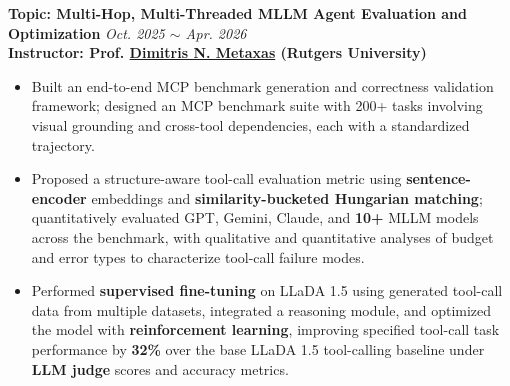 \documentclass{article}
\begin{document}
\vspace{-10pt}
\noindent \textbf{Topic: Multi-Hop, Multi-Threaded MLLM Agent Evaluation and Optimization} \hfill \emph{Oct. 2025 $\sim$ Apr. 2026}\\
\textbf{Instructor: Prof. \href{https://people.cs.rutgers.edu/~dnm/}{\color{blue}Dimitris N. Metaxas} (Rutgers University)}
\begin{itemize}[noitemsep,nolistsep,leftmargin=*]
\item Built an end-to-end MCP benchmark generation and correctness validation framework; designed an MCP benchmark suite with 200+ tasks involving visual grounding and cross-tool dependencies, each with a standardized trajectory.
\item Proposed a structure-aware tool-call evaluation metric using \textbf{sentence-encoder} embeddings and \textbf{similarity-bucketed Hungarian matching}; quantitatively evaluated GPT, Gemini, Claude, and \textbf{10+} MLLM models across the benchmark, with qualitative and quantitative analyses of budget and error types to characterize tool-call failure modes.
\item Performed \textbf{supervised fine-tuning} on LLaDA 1.5 using generated tool-call data from multiple datasets, integrated a reasoning module, and optimized the model with \textbf{reinforcement learning}, improving specified tool-call task performance by \textbf{32\%} over the base LLaDA 1.5 tool-calling baseline under \textbf{LLM judge} scores and accuracy metrics.\\

\end{itemize}
\end{document}
